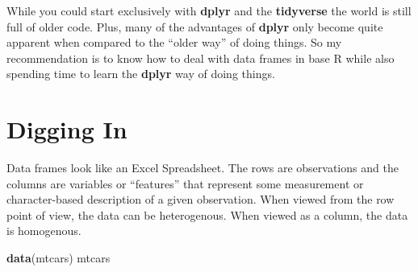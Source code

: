 \documentclass[]{book}
\newenvironment{Shaded}{\begin{snugshade}}{\end{snugshade}}
\newcommand{\KeywordTok}[1]{\textcolor[rgb]{0.13,0.29,0.53}{\textbf{#1}}}
\newcommand{\NormalTok}[1]{#1}
\begin{document}
While you could start exclusively with \textbf{dplyr} and the
\textbf{tidyverse} the world is still full of older code. Plus, many of
the advantages of \textbf{dplyr} only become quite apparent when
compared to the ``older way'' of doing things. So my recommendation is
to know how to deal with data frames in base R while also spending time
to learn the \textbf{dplyr} way of doing things.

\chapter{Digging In}\label{digging-in}

Data frames look like an Excel Spreadsheet. The rows are observations
and the columns are variables or ``features'' that represent some
measurement or character-based description of a given observation. When
viewed from the row point of view, the data can be heterogenous. When
viewed as a column, the data is homogenous.

\begin{Shaded}
\begin{Highlighting}[]
\KeywordTok{data}\NormalTok{(mtcars)}
\NormalTok{mtcars}
\end{Highlighting}
\end{Shaded}
\end{document}
